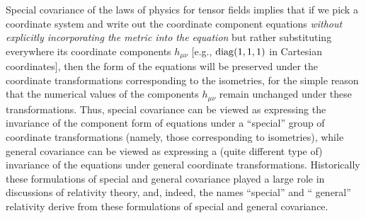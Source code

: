 Special covariance of the laws of physics for tensor fields implies that if we pick
a coordinate system and write out the coordinate component equations
\emph{without explicitly incorporating the metric into the equation} but rather
substituting everywhere its coordinate components \(h_{\mu\nu}\) [e.g.,
\(\operatorname{diag}(1,1,1)\) in Cartesian coordinates], then the form of the equations will
be preserved under the coordinate transformations corresponding to the
isometries, for the simple reason that the numerical values of the components
\(h_{\mu\nu}\) remain unchanged under these transformations. Thus, special
covariance can be viewed as expressing the invariance of the component form of
equations under a \textquotedblleft special\textquotedblright{} group of
coordinate transformations (namely, those corresponding to isometries), while
general covariance can be viewed as expressing a (quite different type of)
invariance of the equations under general coordinate transformations. Historically
these formulations of special and general covariance played a large role in
discussions of relativity theory, and, indeed, the names
\textquotedblleft special\textquotedblright{} and \textquotedblleft
general\textquotedblright{} relativity derive from these formulations of special
and general covariance.
